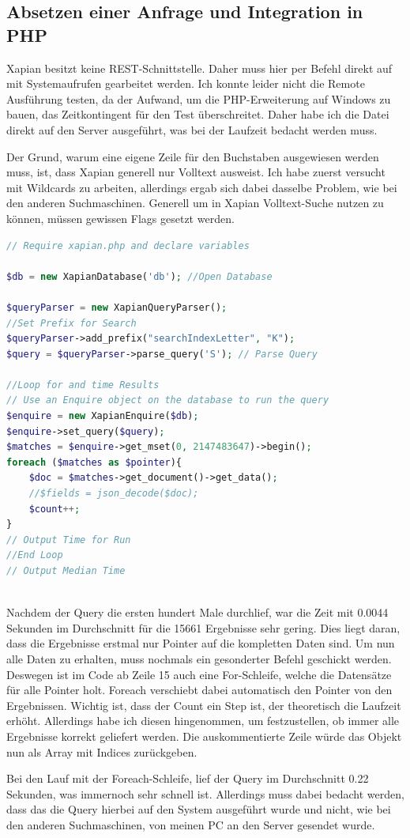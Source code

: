 \subsection{Absetzen einer Anfrage und Integration in PHP}

Xapian besitzt keine REST-Schnittstelle. Daher muss hier per Befehl direkt auf mit Systemaufrufen gearbeitet werden. Ich konnte leider nicht die Remote Ausführung testen, da der Aufwand, um die PHP-Erweiterung auf Windows zu bauen, das Zeitkontingent für den Test überschreitet. Daher habe ich die Datei direkt auf den Server ausgeführt, was bei der Laufzeit bedacht werden muss. 

Der Grund, warum eine eigene Zeile für den Buchstaben ausgewiesen werden muss, ist, dass Xapian generell nur Volltext ausweist. Ich habe zuerst versucht mit Wildcards zu arbeiten, allerdings ergab sich dabei dasselbe Problem, wie bei den anderen Suchmaschinen. Generell um in Xapian Volltext-Suche nutzen zu können, müssen gewissen Flags gesetzt werden.

\begin{lstlisting}[language=php, frame=single, label={lst:managedSchema}, 
	morekeywords={type,uninvertible,indexed,stored,field,multiValued, name}] 
// Require xapian.php and declare variables

$db = new XapianDatabase('db'); //Open Database

$queryParser = new XapianQueryParser();
//Set Prefix for Search
$queryParser->add_prefix("searchIndexLetter", "K"); 
$query = $queryParser->parse_query('S'); // Parse Query

//Loop for and time Results
// Use an Enquire object on the database to run the query
$enquire = new XapianEnquire($db);
$enquire->set_query($query);
$matches = $enquire->get_mset(0, 2147483647)->begin();
foreach ($matches as $pointer){
	$doc = $matches->get_document()->get_data();
	//$fields = json_decode($doc);
	$count++;
}
// Output Time for Run
//End Loop 
// Output Median Time
	
\end{lstlisting}

Nachdem der Query die ersten hundert Male durchlief, war die Zeit mit 0.0044 Sekunden im Durchschnitt für die 15661 Ergebnisse sehr gering. Dies liegt daran, dass die Ergebnisse erstmal nur Pointer auf die kompletten Daten sind. Um nun alle Daten zu erhalten, muss nochmals ein gesonderter Befehl geschickt werden. Deswegen ist im Code ab Zeile 15 auch eine For-Schleife, welche die Datensätze für alle Pointer holt. Foreach verschiebt dabei automatisch den Pointer von den Ergebnissen. Wichtig ist, dass der Count ein Step ist, der theoretisch die Laufzeit erhöht. Allerdings habe ich diesen hingenommen, um festzustellen, ob immer alle Ergebnisse korrekt geliefert werden. 
Die auskommentierte Zeile würde das Objekt nun als Array mit Indices zurückgeben. 

Bei den Lauf mit der Foreach-Schleife, lief der Query im Durchschnitt 0.22 Sekunden, was immernoch sehr schnell ist. Allerdings muss dabei bedacht werden, dass das die Query hierbei auf den System ausgeführt wurde und nicht, wie bei den anderen Suchmaschinen, von meinen PC an den Server gesendet wurde. 

